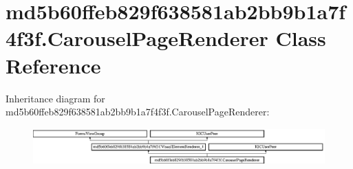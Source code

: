 \hypertarget{classmd5b60ffeb829f638581ab2bb9b1a7f4f3f_1_1CarouselPageRenderer}{}\section{md5b60ffeb829f638581ab2bb9b1a7f4f3f.\+Carousel\+Page\+Renderer Class Reference}
\label{classmd5b60ffeb829f638581ab2bb9b1a7f4f3f_1_1CarouselPageRenderer}
Inheritance diagram for md5b60ffeb829f638581ab2bb9b1a7f4f3f.\+Carousel\+Page\+Renderer\+:\begin{figure}[H]
\begin{center}
\leavevmode
\includegraphics[height=1.403509cm]{classmd5b60ffeb829f638581ab2bb9b1a7f4f3f_1_1CarouselPageRenderer}
\end{center}
\end{figure}
